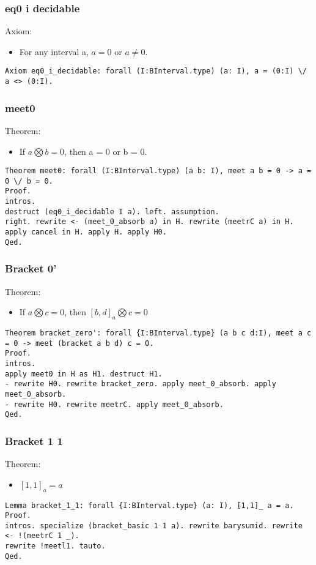 \documentclass[a4paper,10pt]{article} %
\begin{document}
\subsubsection{eq0 i decidable}
Axiom:
\begin{itemize}
    \item For any interval a, $a = 0$ or $a \neq 0$.
\end{itemize}
\begin{lstlisting}
Axiom eq0_i_decidable: forall (I:BInterval.type) (a: I), a = (0:I) \/ a <> (0:I).
\end{lstlisting}

\subsubsection{meet0}
Theorem:
\begin{itemize}
    \item If $a \bigotimes b = 0$, then a = 0 or b = 0.
\end{itemize}
\begin{lstlisting}
Theorem meet0: forall (I:BInterval.type) (a b: I), meet a b = 0 -> a = 0 \/ b = 0.
Proof.
intros.
destruct (eq0_i_decidable I a). left. assumption.
right. rewrite <- (meet_0_absorb a) in H. rewrite (meetrC a) in H. 
apply cancel in H. apply H. apply H0.
Qed.
\end{lstlisting}

\subsubsection{Bracket 0'}
Theorem:
\begin{itemize}
    \item If $a \bigotimes c = 0$, then $[b, d]_a \bigotimes c = 0$
\end{itemize}
\begin{lstlisting}
Theorem bracket_zero': forall {I:BInterval.type} (a b c d:I), meet a c = 0 -> meet (bracket a b d) c = 0.
Proof.
intros.
apply meet0 in H as H1. destruct H1. 
- rewrite H0. rewrite bracket_zero. apply meet_0_absorb. apply meet_0_absorb.
- rewrite H0. rewrite meetrC. apply meet_0_absorb.
Qed.
\end{lstlisting}

\subsubsection{Bracket 1 1}
Theorem:
\begin{itemize}
    \item $[1, 1]_a = a$
\end{itemize}
\begin{lstlisting}
Lemma bracket_1_1: forall {I:BInterval.type} (a: I), [1,1]_ a = a.
Proof.
intros. specialize (bracket_basic 1 1 a). rewrite barysumid. rewrite <- !(meetrC 1 _).
rewrite !meetl1. tauto.
Qed.
\end{lstlisting}
\end{document}
